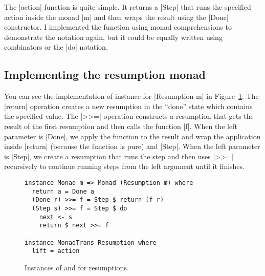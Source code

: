 \documentclass{tmr}
\newcommand{\authornote}[3]{}
\newcommand\bay[1]{\authornote{brent}{blue}{#1}}
\newcommand\tp[1]{\authornote{tomas}{red}{#1}}
\begin{document}
The |action| function is quite simple. It returns a |Step| that runs the specified action 
inside the monad |m| and then wraps the result using the |Done| constructor. I implemented the
function using monad comprehensions to demonstrate the notation again, but it could be equally 
written using combinators or the |do| notation.

\bay{You are again trying to argue that the monad
  comprehension syntax is better here because it is more succinct, but
  this is a straw-man argument: I would not implement action' like
  this at all, but as  Step \$ Done <\$> a.}
\tp{I think this wasn't very useful paragraph anyway, so I deleted it. Anyway, I quite like using
comprehensions because I find them more readable than what you suggested. (But that's because
I'm not a big fan of point-free style in general. I'm sure it's fine for Haskell programmers, but
I think that less experienced people would have serious troubles reading it -- if it doesn't follow
some regular pattern like .. <\$> .. <*> ...) }


\subsection{Implementing the resumption monad}
You can see the implementation of  instance for
|Resumption m| in Figure~\ref{fig:poorman-instance}. 
The |return| operation creates a new resumption in the ``done'' state
which contains the specified 
value. The |>>=| operation constructs a resumption that gets the result of the 
first resumption and then calls the function |f|. When the left parameter is |Done|, we 
apply the function to the result and wrap the application inside |return| (because the function
is pure) and |Step|. When the left parameter is |Step|, we create a resumption that runs the
step and then uses |>>=| recursively to continue running steps from the left argument until it 
finishes.

\begin{figure}
\begin{verbatim}
instance Monad m => Monad (Resumption m) where
  return a = Done a
  (Done r) >>= f = Step $ return (f r)
  (Step s) >>= f = Step $ do
    next <- s
    return $ next >>= f

instance MonadTrans Resumption where
  lift = action
\end{verbatim}
\caption{Instances of  and  
  for resumptions.}
\label{fig:poorman-instance}
\end{figure}
\end{document}
